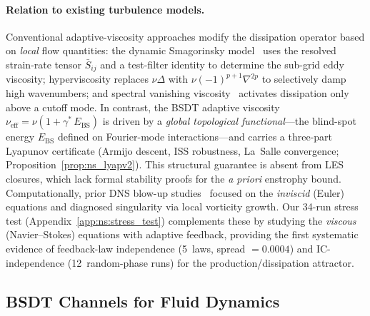 \documentclass[final]{siamltex}
\begin{document}
\paragraph{Relation to existing turbulence models.}
Conventional adaptive-viscosity approaches modify the dissipation
operator based on \emph{local} flow quantities: the dynamic
Smagorinsky model~\cite{smagorinsky1963,germano1991} uses the
resolved strain-rate tensor $\bar{S}_{ij}$ and a test-filter
identity to determine the sub-grid eddy viscosity;
hyperviscosity replaces $\nu\Delta$ with $\nu(-1)^{p+1}\nabla^{2p}$
to selectively damp high wavenumbers; and spectral vanishing
viscosity~\cite{tadmor1989} activates dissipation only above a
cutoff mode.  In contrast, the BSDT adaptive viscosity
$\nu_{\mathrm{eff}} = \nu(1 + \gamma^*\,E_{\mathrm{BS}})$ is
driven by a \emph{global topological functional}---the
blind-spot energy $E_{\mathrm{BS}}$ defined on Fourier-mode
interactions---and carries a three-part Lyapunov certificate
(Armijo descent, ISS robustness, La~Salle convergence;
Proposition~\ref{prop:ns_lyapv2}).  This structural guarantee
is absent from LES closures, which lack formal stability
proofs for the \emph{a priori} enstrophy bound.
Computationally, prior DNS blow-up studies~\cite{kerr1993,houli2006}
focused on the \emph{inviscid} (Euler) equations and diagnosed
singularity via local vorticity growth.
Our 34-run stress test (Appendix~\ref{app:ns:stress_test})
complements these by studying the \emph{viscous} (Navier--Stokes)
equations with adaptive feedback, providing the first systematic
evidence of feedback-law independence (5~laws, spread $= 0.0004$)
and IC-independence (12~random-phase runs) for the
production/dissipation attractor.

\subsection{BSDT Channels for Fluid Dynamics}\label{sec:ns:channels}
\end{document}
